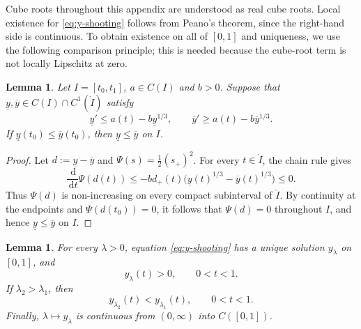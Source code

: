 \documentclass[12pt]{amsart}
\numberwithin{equation}{section}
\theoremstyle{plain}
\newtheorem{lemma}[theorem]{Lemma}
\theoremstyle{definition}
\newcommand{\dd}{\,\mathrm d}
\begin{document}
Cube roots throughout this appendix are understood as real cube roots.
Local existence for \eqref{eq:y-shooting} follows from Peano's theorem, since
the right-hand side is continuous.  To obtain existence on all of \([0,1]\) and
uniqueness, we use the following comparison principle; this is needed because
the cube-root term is not locally Lipschitz at zero.

\begin{lemma}
\label{lem:cuberoot-comparison}
Let \(I=[t_0,t_1]\), \(a\in C(I)\) and \(b>0\). Suppose that
\(\underline y,\overline y\in C(I)\cap C^1(\mathring{I})\) satisfy
\[
 \underline y'\le a(t)-b\underline y^{1/3},
 \qquad
 \overline y'\ge a(t)-b\overline y^{1/3}.
\]
If
\(\underline y(t_0)\le\overline y(t_0)\), then
\(\underline y\le\overline y\) on \(I\).
\end{lemma}

\begin{proof}
Let \(d:=\underline y-\overline y\) and
\(\Psi(s)=\frac12(s_+)^2\).  For every \(t\in\mathring I\), the chain
rule gives
\[
 \frac{\dd}{\dd t}\Psi(d(t))
 \le -b d_+(t)
 \bigl(\underline y(t)^{1/3}-\overline y(t)^{1/3}\bigr)
 \le 0.
\]
Thus \(\Psi(d)\) is non-increasing on every compact subinterval of
$\mathring I$.  By continuity at the endpoints and
\(\Psi(d(t_0))=0\), it follows that \(\Psi(d)=0\) throughout \(I\), and hence
\(\underline y\le\overline y\) on \(I\).
\end{proof}

\begin{lemma}
\label{lem:shooting-properties}
For every \(\lambda>0\), equation \eqref{eq:y-shooting} has a unique solution
\(y_\lambda\) on \([0,1]\), and
\begin{equation}
    \label{eq:y>0}
y_\lambda(t)>0,\qquad 0<t<1.
\end{equation}
  If
\(\lambda_2>\lambda_1\), then
\begin{equation}
 y_{\lambda_2}(t)<y_{\lambda_1}(t),
 \qquad 0<t<1.
 \label{eq:shooting-strict-order}
\end{equation}
Finally, \(\lambda\mapsto y_\lambda\) is continuous from \((0,\infty)\) into \(C([0,1])\).
\end{lemma}
\end{document}
